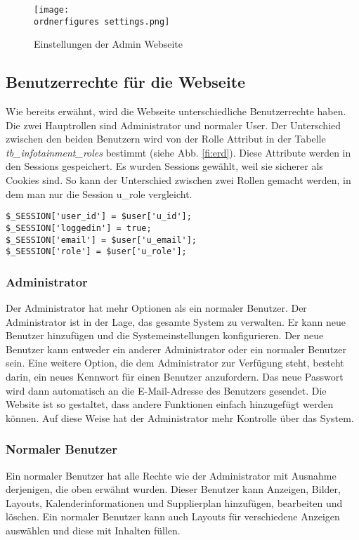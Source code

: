 \begin{figure}[H]
	\centering
	\texttt{[image: \\ordnerfigures settings.png]}
	\caption{Einstellungen der Admin Webseite}
	\label{fi:settings}
\end{figure}


\subsection{Benutzerrechte für die Webseite}
Wie bereits erwähnt, wird die Webseite unterschiedliche Benutzerrechte haben. Die zwei Hauptrollen sind Administrator und normaler User. Der Unterschied zwischen den beiden Benutzern wird von der Rolle Attribut in der Tabelle \textit{tb\_infotainment\_roles} bestimmt (siehe Abb. \ref{fi:erd}). Diese Attribute werden in den Sessions gespeichert. Es wurden Sessions gewählt, weil sie sicherer als Cookies sind. \cite{40_sessions_cookies} So kann der Unterschied zwischen zwei Rollen gemacht werden, in dem man nur die Session u\_role vergleicht.
\begin{lstlisting}[frame=single]
$_SESSION['user_id'] = $user['u_id'];
$_SESSION['loggedin'] = true;
$_SESSION['email'] = $user['u_email'];
$_SESSION['role'] = $user['u_role'];
\end{lstlisting}

\subsubsection{Administrator}
Der Administrator hat mehr Optionen als ein normaler Benutzer. Der Administrator ist in der Lage, das gesamte System zu verwalten. Er kann neue Benutzer hinzufügen und die Systemeinstellungen konfigurieren. Der neue Benutzer kann entweder ein anderer Administrator oder ein normaler Benutzer sein. Eine weitere Option, die dem Administrator zur Verfügung steht, besteht darin, ein neues Kennwort für einen Benutzer anzufordern. Das neue Passwort wird dann automatisch an die E-Mail-Adresse des Benutzers gesendet. Die Website ist so gestaltet, dass andere Funktionen einfach hinzugefügt werden können. Auf diese Weise hat der Administrator mehr Kontrolle über das System.

\subsubsection{Normaler Benutzer}
Ein normaler Benutzer hat alle Rechte wie der Administrator mit Ausnahme derjenigen, die oben erwähnt wurden. Dieser Benutzer kann Anzeigen, Bilder, Layouts, Kalenderinformationen und Supplierplan hinzufügen, bearbeiten und löschen. Ein normaler Benutzer kann auch Layouts für verschiedene Anzeigen auswählen und diese mit Inhalten füllen.


